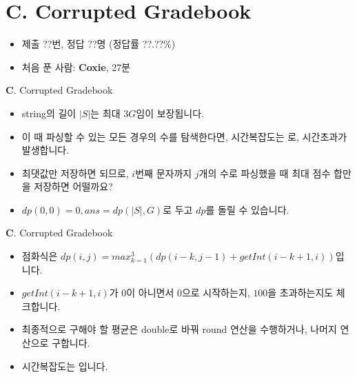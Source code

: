 \section{C. Corrupted Gradebook}

\begin{frame} %
    \begin{itemize}
        \item 제출 ??번, 정답 ??명 (정답률 ??.??\%)
        \item 처음 푼 사람: \textbf{Coxie}, 27분
    \end{itemize}
\end{frame}

\begin{frame}{\textbf{C}. Corrupted Gradebook}
    \begin{itemize}
        \item string의 길이 $|S|$는 최대 $3G$임이 보장됩니다.
        \item 이 때 파싱할 수 있는 모든 경우의 수를 탐색한다면, 시간복잡도는 로, 시간초과가 발생합니다.
        \item 최댓값만 저장하면 되므로, $i$번째 문자까지 $j$개의 수로 파싱했을 때 최대 점수 합만을 저장하면 어떨까요?
        \item $dp(0,0)=0, ans=dp(|S|,G)$로 두고 $dp$를 돌릴 수 있습니다.
    \end{itemize}
\end{frame}

\begin{frame}{\textbf{C}. Corrupted Gradebook}
    \begin{itemize}
        \item 점화식은 $dp(i,j)=max_{k=1}^{3}(dp(i-k,j-1)+getInt(i-k+1,i))$입니다.
        \item $getInt(i-k+1,i)$가 $0$이 아니면서 $0$으로 시작하는지, $100$을 초과하는지도 체크합니다.
        \item 최종적으로 구해야 할 평균은 double로 바꿔 round 연산을 수행하거나, 나머지 연산으로 구합니다.
        \item 시간복잡도는 입니다.
    \end{itemize}
\end{frame}